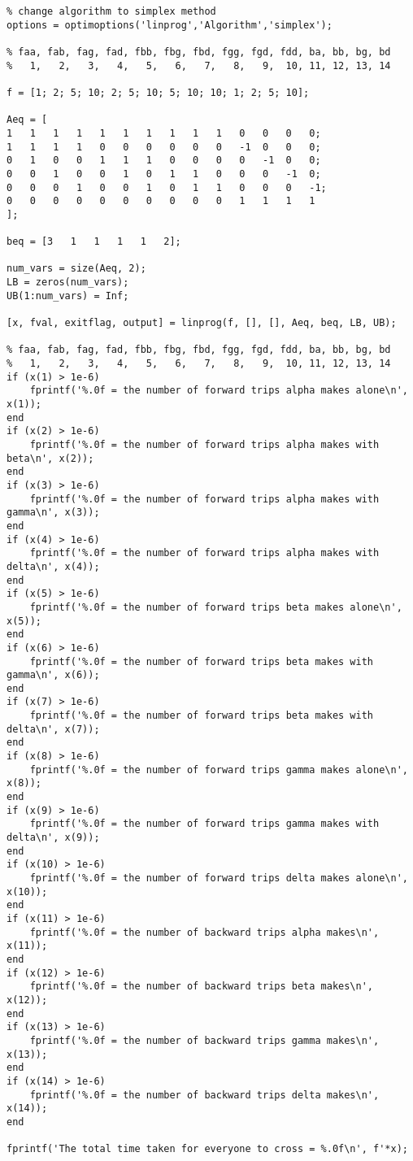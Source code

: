 \documentclass{article}
\begin{document}
\begin{lstlisting}
% change algorithm to simplex method
options = optimoptions('linprog','Algorithm','simplex');

% faa, fab, fag, fad, fbb, fbg, fbd, fgg, fgd, fdd, ba, bb, bg, bd
%   1,   2,   3,   4,   5,   6,   7,   8,   9,  10, 11, 12, 13, 14

f = [1; 2; 5; 10; 2; 5; 10; 5; 10; 10; 1; 2; 5; 10];

Aeq = [
1   1   1   1   1   1   1   1   1   1   0   0   0   0;
1   1   1   1   0   0   0   0   0   0   -1  0   0   0;
0   1   0   0   1   1   1   0   0   0   0   -1  0   0;
0   0   1   0   0   1   0   1   1   0   0   0   -1  0;
0   0   0   1   0   0   1   0   1   1   0   0   0   -1;
0   0   0   0   0   0   0   0   0   0   1   1   1   1
];

beq = [3   1   1   1   1   2];

num_vars = size(Aeq, 2);
LB = zeros(num_vars);
UB(1:num_vars) = Inf;

[x, fval, exitflag, output] = linprog(f, [], [], Aeq, beq, LB, UB);

% faa, fab, fag, fad, fbb, fbg, fbd, fgg, fgd, fdd, ba, bb, bg, bd
%   1,   2,   3,   4,   5,   6,   7,   8,   9,  10, 11, 12, 13, 14
if (x(1) > 1e-6)
	fprintf('%.0f = the number of forward trips alpha makes alone\n', x(1));
end
if (x(2) > 1e-6)
	fprintf('%.0f = the number of forward trips alpha makes with beta\n', x(2));
end
if (x(3) > 1e-6)
	fprintf('%.0f = the number of forward trips alpha makes with gamma\n', x(3));
end
if (x(4) > 1e-6)
	fprintf('%.0f = the number of forward trips alpha makes with delta\n', x(4));
end
if (x(5) > 1e-6)
	fprintf('%.0f = the number of forward trips beta makes alone\n', x(5));
end
if (x(6) > 1e-6)
	fprintf('%.0f = the number of forward trips beta makes with gamma\n', x(6));
end
if (x(7) > 1e-6)
	fprintf('%.0f = the number of forward trips beta makes with delta\n', x(7));
end
if (x(8) > 1e-6)
	fprintf('%.0f = the number of forward trips gamma makes alone\n', x(8));
end
if (x(9) > 1e-6)
	fprintf('%.0f = the number of forward trips gamma makes with delta\n', x(9));
end
if (x(10) > 1e-6)
	fprintf('%.0f = the number of forward trips delta makes alone\n', x(10));
end
if (x(11) > 1e-6)
	fprintf('%.0f = the number of backward trips alpha makes\n', x(11));
end
if (x(12) > 1e-6)
	fprintf('%.0f = the number of backward trips beta makes\n', x(12));
end
if (x(13) > 1e-6)
	fprintf('%.0f = the number of backward trips gamma makes\n', x(13));
end
if (x(14) > 1e-6)
	fprintf('%.0f = the number of backward trips delta makes\n', x(14));
end

fprintf('The total time taken for everyone to cross = %.0f\n', f'*x);
\end{lstlisting}
\end{document}
